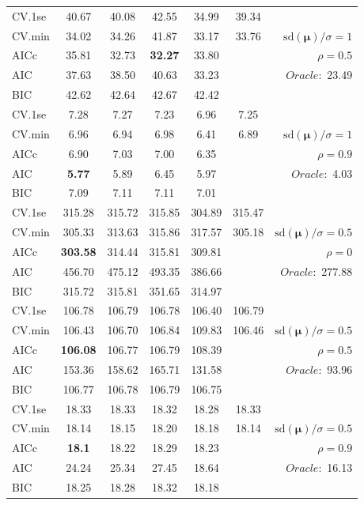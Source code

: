 \begin{table}
\begin{center}
\begin{tabular}{l*{5}{c}|r}
 \hline 
CV.1se & 40.67 & 40.08 & 42.55 & 34.99 & 39.34 & \\
CV.min & 34.02 & 34.26 & 41.87 & 33.17 & 33.76 &  $\mathrm{sd}(\mathbf{\mu})/\sigma=1$ \\
AICc & 35.81 & 32.73 & {\bf 32.27} & 33.80 & & $\rho=0.5$ \\
AIC & 37.63 & 38.50 & 40.63 & 33.23 & &  \multirow{2}{*}{$Oracle: $ 23.49} \\
BIC & 42.62 & 42.64 & 42.67 & 42.42 & &  \\
 \hline 
CV.1se & 7.28 & 7.27 & 7.23 & 6.96 & 7.25 & \\
CV.min & 6.96 & 6.94 & 6.98 & 6.41 & 6.89 &  $\mathrm{sd}(\mathbf{\mu})/\sigma=1$ \\
AICc & 6.90 & 7.03 & 7.00 & 6.35 & & $\rho=0.9$ \\
AIC & {\bf 5.77} & 5.89 & 6.45 & 5.97 & &  \multirow{2}{*}{$Oracle: $ 4.03} \\
BIC & 7.09 & 7.11 & 7.11 & 7.01 & &  \\
 \hline 
CV.1se & 315.28 & 315.72 & 315.85 & 304.89 & 315.47 & \\
CV.min & 305.33 & 313.63 & 315.86 & 317.57 & 305.18 &  $\mathrm{sd}(\mathbf{\mu})/\sigma=0.5$ \\
AICc & {\bf 303.58} & 314.44 & 315.81 & 309.81 & & $\rho=0$ \\
AIC & 456.70 & 475.12 & 493.35 & 386.66 & &  \multirow{2}{*}{$Oracle: $ 277.88} \\
BIC & 315.72 & 315.81 & 351.65 & 314.97 & &  \\
 \hline 
CV.1se & 106.78 & 106.79 & 106.78 & 106.40 & 106.79 & \\
CV.min & 106.43 & 106.70 & 106.84 & 109.83 & 106.46 &  $\mathrm{sd}(\mathbf{\mu})/\sigma=0.5$ \\
AICc & {\bf 106.08} & 106.77 & 106.79 & 108.39 & & $\rho=0.5$ \\
AIC & 153.36 & 158.62 & 165.71 & 131.58 & &  \multirow{2}{*}{$Oracle: $ 93.96} \\
BIC & 106.77 & 106.78 & 106.79 & 106.75 & &  \\
 \hline 
CV.1se & 18.33 & 18.33 & 18.32 & 18.28 & 18.33 & \\
CV.min & 18.14 & 18.15 & 18.20 & 18.18 & 18.14 &  $\mathrm{sd}(\mathbf{\mu})/\sigma=0.5$ \\
AICc & {\bf 18.1} & 18.22 & 18.29 & 18.23 & & $\rho=0.9$ \\
AIC & 24.24 & 25.34 & 27.45 & 18.64 & &  \multirow{2}{*}{$Oracle: $ 16.13} \\
BIC & 18.25 & 18.28 & 18.32 & 18.18 & &  \\
 \hline 
\end{tabular}
\end{center}
\vspace{-1cm}
\end{table}




